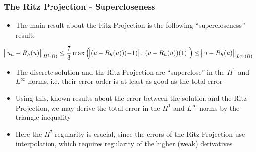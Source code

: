 \begin{frame}
	\frametitle{The Ritz Projection - Supercloseness}
	\begin{itemize}
		\item The main result about the Ritz Projection is the following ``supercloseness'' result:
	\end{itemize}
	\begin{equation}\label{eq:supercloseness}
	\norm{u_h - R_h(u)}_{H^1(\Omega)} \leq \frac{7}{3} \max \left(\abs{(u-R_h(u))(-1)}, \abs{(u-R_h(u))(1)}\right) \leq \norm{u-R_h(u)}_{L^{\infty}(\Omega)}
\end{equation}
\vspace{-1cm}
	\begin{itemize}
		\item The discrete solution and the Ritz Projection are ``superclose'' in the $H^1$ and $L^\infty$ norms, i.e. their error order is at least as good as the total error
		\item Using this, known results about the error between the solution and the Ritz Projection, we may derive the total error in the $H^1$ and $L^\infty$ norms by the triangle inequality
		\item Here the $H^2$ regularity is crucial, since the errors of the Ritz Projection use interpolation, which requires regularity of the higher (weak) derivatives
	\end{itemize}
\end{frame}

